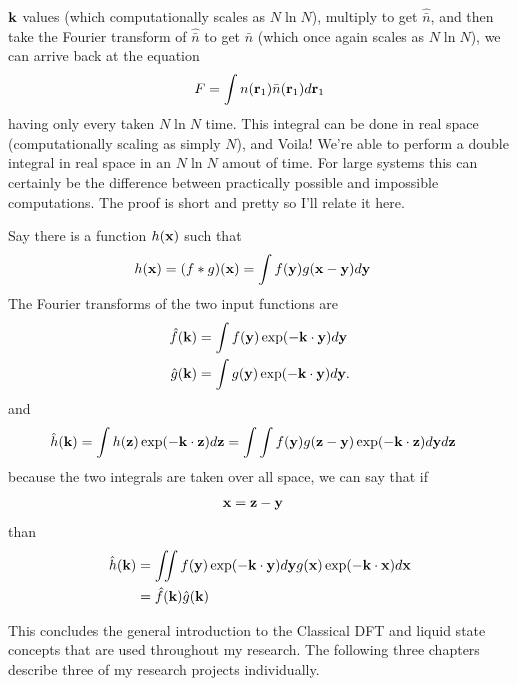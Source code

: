 $\textbf{k}$ values (which computationally scales as $N \ln N$), multiply to
get $\hat{\bar{n}}$, and then take the Fourier transform of
$\hat{\bar{n}}$ to get $\bar{n}$ (which once again scales as $N \ln
N$), we can arrive back at the equation
\begin{align}
F &= \int n(\textbf{r}_1)\bar{n}(\textbf{r}_1)d\textbf{r}_1\\
\end{align}
having only every taken $N \ln N$ time.  This integral can be done in
real space (computationally scaling as simply $N$), and Voila!  We're
able to perform a double integral in real space in an $N \ln N$ amout
of time.  For large systems this can certainly be the difference
between practically possible and impossible computations.  The proof
is short and pretty so I'll relate it here.

Say there is a function $h(\textbf{x})$ such that
\begin{align}
  h(\textbf{x}) &= (f\ast g)(\textbf{x}) = \int f(\textbf{y})g(\textbf{x}-\textbf{y})d\textbf{y}
\end{align}
The Fourier transforms of the two input functions are
\begin{align}
  \hat{f}(\textbf{k}) &= \int f(\textbf{y}) \exp(-\textbf{k} \cdot \textbf{y})d\textbf{y} \\
  \hat{g}(\textbf{k}) &= \int g(\textbf{y}) \exp(-\textbf{k} \cdot \textbf{y})d\textbf{y}.
\end{align}
and
\begin{align}
  \hat{h}(\textbf{k}) = \int h(\textbf{z}) \exp(-\textbf{k} \cdot \textbf{z}) d\textbf{z} &= \int \int f(\textbf{y}) g(\textbf{z}-\textbf{y}) \exp(-\textbf{k} \cdot \textbf{z}) d\textbf{y} d\textbf{z}
\end{align}
because the two integrals are taken over all space, we can say that if
\begin{align}
\textbf{x} &= \textbf{z} - \textbf{y}
\end{align}
than
\begin{align}
\hat{h}(\textbf{k}) &= \iint f(\textbf{y}) \exp(-\textbf{k} \cdot \textbf{y} ) d\textbf{y} g(\textbf{x}) \exp(-\textbf{k} \cdot \textbf{x}) d\textbf{x} \\
&= \hat{f}(\textbf{k}) \hat{g}(\textbf{k})
\end{align}


This concludes the general introduction to the Classical DFT and
liquid state concepts that are used throughout my research.  The
following three chapters describe three of my research projects
individually.

